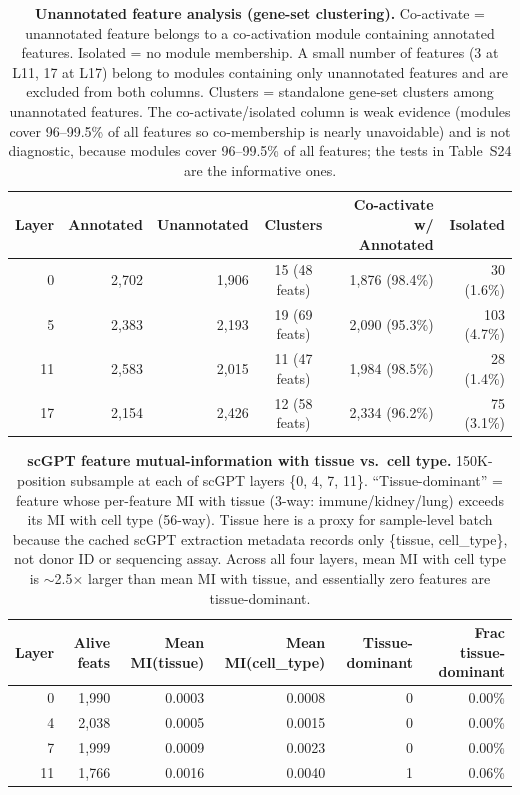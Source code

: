 \documentclass[11pt]{article}
\begin{document}
\begin{table}[H]
\centering
\caption{\textbf{Unannotated feature analysis (gene-set clustering).} Co-activate = unannotated feature belongs to a co-activation module containing annotated features. Isolated = no module membership. A small number of features (3 at L11, 17 at L17) belong to modules containing only unannotated features and are excluded from both columns. Clusters = standalone gene-set clusters among unannotated features. The co-activate/isolated column is weak evidence (modules cover 96--99.5\% of all features so co-membership is nearly unavoidable) and is not diagnostic, because modules cover 96--99.5\% of all features; the tests in Table~S24 are the informative ones.}
\label{tab:novel}
\smallskip
\begin{tabular}{rrrcrr}
\toprule
Layer & Annotated & Unannotated & Clusters & Co-activate w/ Annotated & Isolated \\
\midrule
0  & 2,702 & 1,906 & 15 (48 feats) & 1,876 (98.4\%) & 30 (1.6\%) \\
5  & 2,383 & 2,193 & 19 (69 feats) & 2,090 (95.3\%) & 103 (4.7\%) \\
11 & 2,583 & 2,015 & 11 (47 feats) & 1,984 (98.5\%) & 28 (1.4\%) \\
17 & 2,154 & 2,426 & 12 (58 feats) & 2,334 (96.2\%) & 75 (3.1\%) \\
\bottomrule
\end{tabular}
\end{table}

\begin{table}[H]
\centering
\caption{\textbf{scGPT feature mutual-information with tissue vs.\ cell type.} 150K-position subsample at each of scGPT layers \{0, 4, 7, 11\}. ``Tissue-dominant'' = feature whose per-feature MI with tissue (3-way: immune/kidney/lung) exceeds its MI with cell type (56-way). Tissue here is a proxy for sample-level batch because the cached scGPT extraction metadata records only \{tissue, cell\_type\}, not donor ID or sequencing assay. Across all four layers, mean MI with cell type is $\sim$2.5$\times$ larger than mean MI with tissue, and essentially zero features are tissue-dominant. }
\label{tab:batch}
\smallskip
\small
\begin{tabular}{rrrrrr}
\toprule
Layer & Alive feats & Mean MI(tissue) & Mean MI(cell\_type) & Tissue-dominant & Frac tissue-dominant \\
\midrule
0  & 1{,}990 & 0.0003 & 0.0008 & 0 & 0.00\% \\
4  & 2{,}038 & 0.0005 & 0.0015 & 0 & 0.00\% \\
7  & 1{,}999 & 0.0009 & 0.0023 & 0 & 0.00\% \\
11 & 1{,}766 & 0.0016 & 0.0040 & 1 & 0.06\% \\
\bottomrule
\end{tabular}
\end{table}
\end{document}
